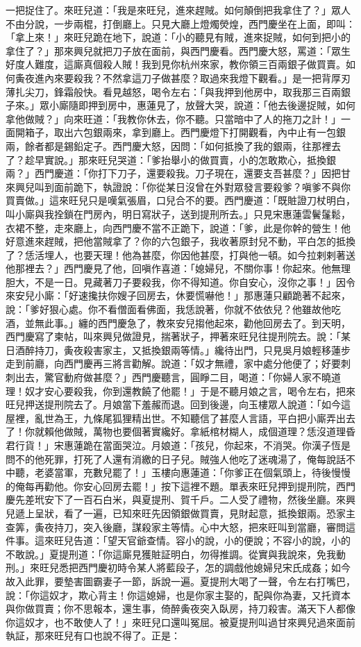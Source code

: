 一把捉住了。來旺兒道：「我是來旺兒，進來趕賊。如何顛倒把我拿住了？」眾人不由分說，一步兩棍，打倒廳上。只見大廳上燈燭熒煌，西門慶坐在上面，即叫：「拿上來！」來旺兒跪在地下，說道：「小的聽見有賊，進來捉賊，如何到把小的拿住了？」那來興兒就把刀子放在面前，與西門慶看。西門慶大怒，罵道：「眾生好度人難度，這廝真個殺人賊！我到見你杭州來家，教你領三百兩銀子做買賣。如何夤夜進內來要殺我？不然拿這刀子做甚麼？取過來我燈下觀看。」是一把背厚刃薄扎尖刀，鋒霜般快。看見越怒，喝令左右：「與我押到他房中，取我那三百兩銀子來。」眾小廝隨即押到房中，惠蓮見了，放聲大哭，說道：「他去後邊捉賊，如何拿他做賊？」向來旺道：「我教你休去，你不聽。只當暗中了人的拖刀之計！」一面開箱子，取出六包銀兩來，拿到廳上。西門慶燈下打開觀看，內中止有一包銀兩，餘者都是錫鉛定子。西門慶大怒，因問：「如何抵換了我的銀兩，往那裡去了？趁早實說。」那來旺兒哭道：「爹抬舉小的做買賣，小的怎敢欺心，抵換銀兩？」西門慶道：「你打下刀子，還要殺我。刀子現在，還要支吾甚麼？」因把甘來興兒叫到面前跪下，執證說：「你從某日沒曾在外對眾發言要殺爹？嗔爹不與你買賣做。」這來旺兒只是嘆氣張眉，口兒合不的要。西門慶道：「既賍證刀杖明白，叫小廝與我拴鎖在門房內，明日寫狀子，送到提刑所去。」只見宋惠蓮雲鬢鬔鬆，衣裙不整，走來廳上，向西門慶不當不正跪下，說道：「爹，此是你幹的營生！他好意進來趕賊，把他當賊拿了？你的六包銀子，我收著原封兒不動，平白怎的抵換了？恁活埋人，也要天理！他為甚麼，你因他甚麼，打與他一頓。如今拉剌剌著送他那裡去？」西門慶見了他，回嗔作喜道：「媳婦兒，不關你事！你起來。他無理胆大，不是一日。見藏著刀子要殺我，你不得知道。你自安心，沒你之事！」因令來安兒小廝：「好速攙扶你嫂子回房去，休要慌嚇他！」那惠蓮只顧跪著不起來，說：「爹好狠心處。你不看僧面看佛面，我恁說著，你就不依依兒？他雖故他吃酒，並無此事。」纏的西門慶急了，教來安兒搊他起來，勸他回房去了。到天明，西門慶寫了柬帖，叫來興兒做證見，揣著狀子，押著來旺兒往提刑院去。說：「某日酒醉持刀，夤夜殺害家主，又抵換銀兩等情。」纔待出門，只見吳月娘輕移蓮步走到前廳，向西門慶再三將言勸解。說道：「奴才無禮，家中處分他便了；好要刺刺出去，驚官動府做甚麼？」西門慶聽言，圓睜二目，喝道：「你婦人家不曉道理！奴才安心要殺我，你到還教饒了他罷！」于是不聽月娘之言，喝令左右，把來旺兒押送提刑院去了。月娘當下羞赧而退。回到後邊，向玉樓眾人說道：「如今這屋裡，亂世為王，九條尾狐狸精出世。不知聽信了甚麼人言語，平白把小廝弄出去了！你就賴他做賊，萬物也要個著實纔好。拿紙棺材糊人，成個道理？恁沒道理昏君行貨！」宋惠蓮跪在當面哭泣。月娘道：「孩兒，你起來，不消哭。你漢子恆是問不的他死罪，打死了人還有消繳的日子兒。賊強人他吃了迷魂湯了，俺每說話不中聽，老婆當軍，充數兒罷了！」玉樓向惠蓮道：「你爹正在個氣頭上，待後慢慢的俺每再勸他。你安心回房去罷！」按下這裡不題。單表來旺兒押到提刑院，西門慶先差玳安下了一百石白米，與夏提刑、賀千戶。二人受了禮物，然後坐廳。來興兒遞上呈狀，看了一遍，已知來旺先因領銀做買賣，見財起意，抵換銀兩。恐家主查筭，夤夜持刀，突入後廳，謀殺家主等情。心中大怒，把來旺叫到當廳，審問這件事。這來旺兒告道：「望天官爺查情。容小的說，小的便說；不容小的說，小的不敢說。」夏提刑道：「你這廝見獲賍証明白，勿得推調。從實與我說來，免我動刑。」來旺兒悉把西門慶初時令某人將藍段子，怎的調戲他媳婦兒宋氏成姦；如今故入此罪，要墊害圖霸妻子一節，訴說一遍。夏提刑大喝了一聲，令左右打嘴巴，說：「你這奴才，欺心背主！你這媳婦，也是你家主娶的，配與你為妻，又托資本與你做買賣；你不思報本，還生事，倚醉夤夜突入臥房，持刀殺害。滿天下人都像你這奴才，也不敢使人了！」來旺兒口還叫冤屈。被夏提刑叫過甘來興兒過來面前執証，那來旺兒有口也說不得了。正是：

